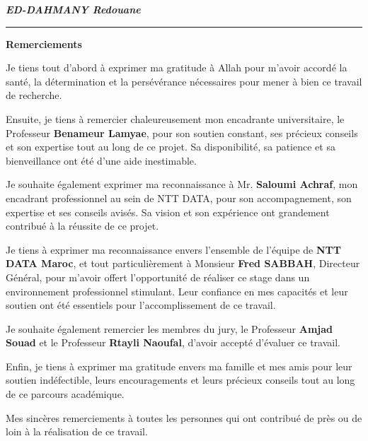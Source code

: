 \documentclass[12pt, a4paper, openany]{report}
\begin{document}
\vspace{0.6cm}

\begin{flushright}
    {\fontsize{14}{16}\selectfont\textit{\textbf{ED-DAHMANY Redouane}}}
\end{flushright}

\vspace{0.1cm}


\newpage
\thispagestyle{frontmatter} 
{} 

\vspace*{0.5cm} 



\noindent
\textcolor{royalBlue}{\rule{0.55\textwidth}{1pt}}
\hfill
{\fontsize{24}{28}\selectfont\color{royalBlue}\bfseries Remerciements}

\vspace{0.0cm}


\begin{large}
\itshape
\setlength{\parskip}{0.3cm} 
\renewcommand{\baselinestretch}{1.3}\selectfont 

Je tiens tout d'abord à exprimer ma gratitude à Allah pour m'avoir accordé la santé, la détermination et la persévérance nécessaires pour mener à bien ce travail de recherche.

Ensuite, je tiens à remercier chaleureusement mon encadrante universitaire, le Professeur \textbf{Benameur Lamyae}, pour son soutien constant, ses précieux conseils et son expertise tout au long de ce projet. Sa disponibilité, sa patience et sa bienveillance ont été d'une aide inestimable.

Je souhaite également exprimer ma reconnaissance à Mr. \textbf{Saloumi Achraf}, mon encadrant professionnel au sein de NTT DATA, pour son accompagnement, son expertise et ses conseils avisés. Sa vision et son expérience ont grandement contribué à la réussite de ce projet.

Je tiens à exprimer ma reconnaissance envers l'ensemble de l'équipe de \textbf{NTT DATA Maroc}, et tout particulièrement à Monsieur \textbf{Fred SABBAH}, Directeur Général, pour m'avoir offert l'opportunité de réaliser ce stage dans un environnement professionnel stimulant. Leur confiance en mes capacités et leur soutien ont été essentiels pour l'accomplissement de ce travail.

Je souhaite également remercier les membres du jury, le Professeur \textbf{Amjad Souad} et le Professeur \textbf{Rtayli Naoufal}, d'avoir accepté d'évaluer ce travail.

Enfin, je tiens à exprimer ma gratitude envers ma famille et mes amis pour leur soutien indéfectible, leurs encouragements et leurs précieux conseils tout au long de ce parcours académique.

Mes sincères remerciements à toutes les personnes qui ont contribué de près ou de loin à la réalisation de ce travail.

\end{large}
\end{document}
